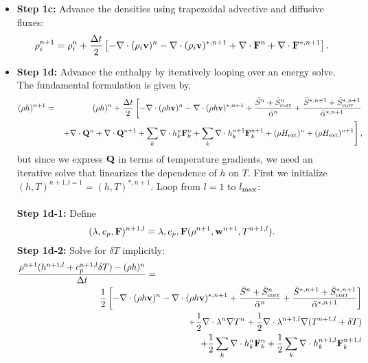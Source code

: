 \documentclass[final]{siamltex}
\def\Fb {{\bf F}}
\def\Qb {{\bf Q}}
\def\vb {{\bf v}}
\def\wb {{\bf w}}
\def\Hext {H_{\rm ext}}
\def\half   {\frac{1}{2}}
\begin{document}
\begin{itemize}
\begin{equation}
\end{equation}
\item {\bf Step 1c:} Advance the densities using trapezoidal advective and diffusive fluxes:
\begin{equation}
\rho_i^{n+1} = \rho_i^n + \frac{\Delta t}{2}\left[-\nabla\cdot(\rho_i\vb)^n -\nabla\cdot(\rho_i\vb)^{*,n+1} + \nabla\cdot\Fb^n + \nabla\cdot\Fb^{*,n+1}\right].
\end{equation}
\item {\bf Step 1d:} Advance the enthalpy by iteratively looping over an energy solve.  The fundamental formulation is given by,
\begin{eqnarray}
(\rho h)^{n+1} &=& (\rho h)^n + \frac{\Delta t}{2}\left[-\nabla\cdot(\rho h\vb)^n -\nabla\cdot(\rho h\vb)^{*,n+1} + \frac{\bar{S}^n + \bar{S}_{\rm corr}^n}{\bar{\alpha}^n} + \frac{\bar{S}^{*,n+1}+ \bar{S}_{\rm corr}^{*,n+1}}{\bar{\alpha}^{*,n+1}}\right.\nonumber\\
&&\left.+ \nabla\cdot\Qb^n + \nabla\cdot\Qb^{n+1} + \sum_k\nabla\cdot h_k^n\Fb_k^n + \sum_k\nabla\cdot h_k^{n+1}\Fb_k^{n+1} + (\rho\Hext)^n + (\rho\Hext)^{n+1}\right],\nonumber\\
\end{eqnarray}
but since we express $\Qb$ in terms of temperature gradients, we need an iterative solve that linearizes
the dependence of $h$ on $T$.  First we initialize $(h,T)^{n+1,l=1} = (h,T)^{*,n+1}$.
Loop from $l=1$ to $l_{\rm max}$:\\ \\
{\bf Step 1d-1:} Define
\begin{equation}
(\lambda,c_p,\Fb)^{n+1,l} = \lambda,c_p,\Fb(\rho^{n+1},\wb^{n+1},T^{n+1,l}).
\end{equation}
{\bf Step 1d-2:} Solve for $\delta T$ implicitly:
\begin{eqnarray}
\frac{\rho^{n+1}(h^{n+1,l} + c_p^{n+1,l}\delta T) - (\rho h)^n}{\Delta t} &=& \nonumber\\
&&\hspace{-1in}\half\left[-\nabla\cdot(\rho h\vb)^n - \nabla\cdot(\rho h\vb)^{*,n+1} + \frac{\bar{S}^n + \bar{S}_{\rm corr}^n}{\bar{\alpha}^n} + \frac{\bar{S}^{*,n+1}+ \bar{S}_{\rm corr}^{*,n+1}}{\bar{\alpha}^{*,n+1}}\right] \nonumber\\
&&\hspace{-1in} + \half\nabla\cdot\lambda^n\nabla T^n + \half\nabla\cdot\lambda^{n+1,l}\nabla(T^{n+1,l} + \delta T)\nonumber\\
&&\hspace{-1in} + \half\sum_k\nabla\cdot h_k^n \Fb_k^n + \half\sum_k\nabla\cdot h_k^{n+1,l} \Fb_k^{n+1,l}\nonumber\\

\end{eqnarray}
\end{itemize}
\end{document}
